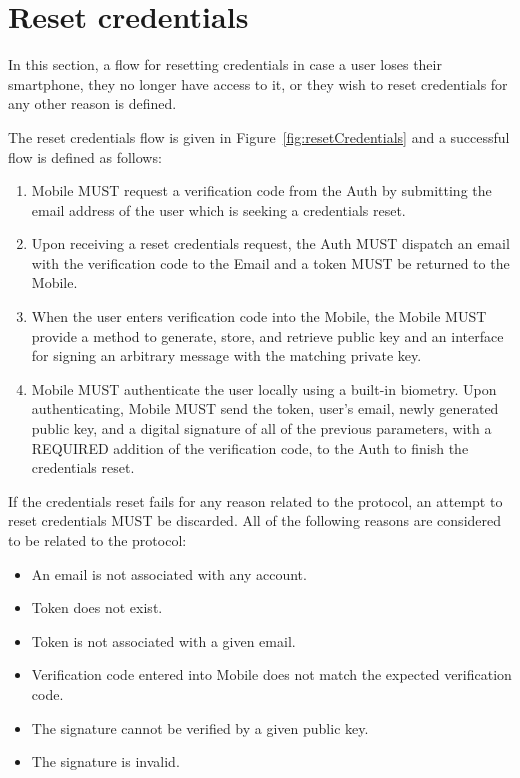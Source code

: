 \section{Reset credentials}
In this section, a flow for resetting credentials in case a user loses their smartphone, they no longer have access to it,
or they wish to reset credentials for any other reason is defined.
\medskip

The reset credentials flow is given in Figure~\ref{fig:resetCredentials} and a successful flow is defined as follows:
    \begin{enumerate}
        \item Mobile MUST request a verification code from the Auth by submitting the email address of the user
              which is seeking a credentials reset.
        \item Upon receiving a reset credentials request, the Auth MUST dispatch an email with the verification
              code to the Email and a token MUST be returned to the Mobile.
        \item When the user enters verification code into the Mobile, the Mobile MUST provide a method to generate,
              store, and retrieve public key and an interface for signing an arbitrary message with the matching 
              private key.
        \item Mobile MUST authenticate the user locally using a built-in biometry. Upon authenticating, Mobile 
              MUST send the token, user's email, newly generated public key, and a digital signature of all of the 
              previous parameters, with a REQUIRED addition of the verification code, to the Auth to finish the 
              credentials reset.
    \end{enumerate}
    
If the credentials reset fails for any reason related to the protocol, an attempt to reset credentials MUST 
be discarded. All of the following reasons are considered to be related to the protocol:
    \begin{itemize}
        \item An email is not associated with any account.
        \item Token does not exist.
        \item Token is not associated with a given email.
        \item Verification code entered into Mobile does not match the expected verification code.
        \item The signature cannot be verified by a given public key.
        \item The signature is invalid.
    \end{itemize}
